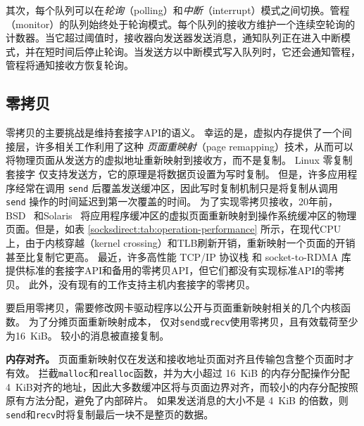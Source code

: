 其次，每个队列可以在\textit {轮询}（polling）和\textit {中断}（interrupt）模式之间切换。管程（monitor）的队列始终处于轮询模式。每个队列的接收方维护一个连续空轮询的计数器。当它超过阈值时，接收器向发送器发送消息，通知队列正在进入中断模式，并在短时间后停止轮询。当发送方以中断模式写入队列时，它还会通知管程，管程将通知接收方恢复轮询。




\subsection{零拷贝}
\label{socksdirect:subsec:zerocopy}


零拷贝的主要挑战是维持套接字API的语义。
幸运的是，虚拟内存提供了一个间接层，许多相关工作利用了这种 \emph {页面重映射}（page remapping）技术，从而可以将物理页面从发送方的虚拟地址重新映射到接收方，而不是复制。
Linux 零复制套接字 \cite {linux-zero-copy} 仅支持发送方，它的原理是将数据页设置为写时复制。
但是，许多应用程序经常在调用 \texttt{send} 后覆盖发送缓冲区，因此写时复制机制只是将复制从调用 \texttt {send} 操作的时间延迟到第一次覆盖的时间。
为了实现零拷贝接收，20年前，BSD~ \cite {thadani1995efficient} 和Solaris~ \cite {chu1996zero} 将应用程序缓冲区的虚拟页面重新映射到操作系统缓冲区的物理页面。但是，如表 \ref {socksdirect:tab:operation-performance} 所示，在现代CPU上，由于内核穿越（kernel crossing）和TLB刷新开销，重新映射一个页面的开销甚至比复制它更高。
最近，许多高性能 TCP/IP 协议栈 \cite {han2012megapipe,yasukata2016stackmap} 和 socket-to-RDMA 库 \cite {rsockets,socketsdirect} 提供标准的套接字API和备用的零拷贝API，但它们都没有实现标准API的零拷贝。
此外，没有现有的工作支持主机内套接字的零拷贝。





要启用零拷贝，需要修改网卡驱动程序以公开与页面重新映射相关的几个内核函数。
为了分摊页面重新映射成本，\libipc{} 仅对\texttt {send}或\texttt {recv}使用零拷贝，且有效载荷至少为16~KiB。
较小的消息被直接复制。

\textbf {内存对齐。}
页面重新映射仅在发送和接收地址页面对齐且传输包含整个页面时才有效。
\libipc{} 拦截\texttt {malloc}和\texttt {realloc}函数，并为大小超过 16~KiB 的内存分配操作分配4~KiB对齐的地址，因此大多数缓冲区将与页面边界对齐，而较小的内存分配按照原有方法分配，避免了内部碎片。
如果发送消息的大小不是 4~KiB 的倍数，则\texttt {send}和\texttt {recv}时将复制最后一块不是整页的数据。

